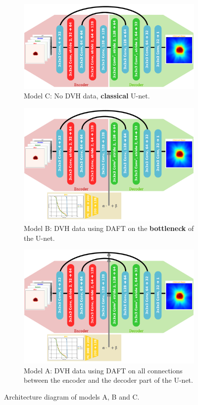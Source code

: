 \begin{figure}
	\centering
	\begin{subfigure}{\linewidth}
		\centering
		\includegraphics[width=11.5cm]{SFPM/modelC.pdf}
		\caption{Model C: No DVH data, \textbf{classical} U-net.}
		\label{fig:model_C_architecture}
	\end{subfigure}
	\begin{subfigure}{\linewidth}
		\centering
		\includegraphics[width=11.5cm]{SFPM/modelB.pdf}
		\caption{Model B: DVH data using DAFT on the \textbf{bottleneck} of the U-net.}
		\label{fig:model_B_architecture}
	\end{subfigure}
	\begin{subfigure}{\linewidth}
		\centering
		\includegraphics[width=11.5cm]{SFPM/modelA.pdf}
		\caption{Model A: DVH data using DAFT on all connections between the encoder and the decoder part of the U-net.}
		\label{fig:model_A_architecture}
	\end{subfigure}
	\caption{Architecture diagram of models A, B and C.}
	\label{fig:models_ABC_architectures}
\end{figure}

